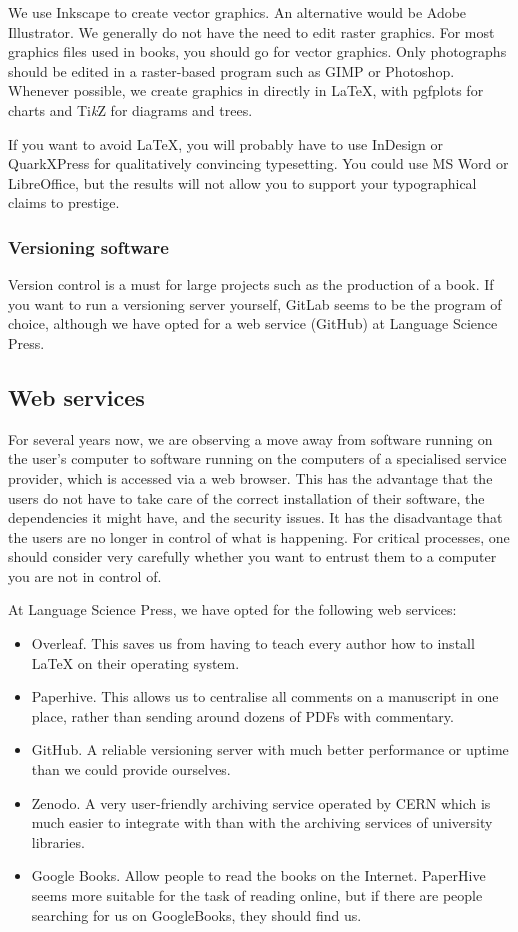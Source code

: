 \documentclass[guidelines,nonflat,modfonts] {langsci/langscibook}
\begin{document}
We use Inkscape to create vector graphics. An alternative would be Adobe Illustrator. We generally do not have the need to edit raster graphics. For most graphics files used in books, you should go for vector graphics. Only photographs should be edited in a raster-based program such as GIMP or Photoshop. Whenever possible, we create graphics in directly in \LaTeX\xspace, with pgfplots for charts and Ti\textit{k}Z for diagrams and trees. 

If you want to avoid \LaTeX\xspace, you will probably have to use InDesign or QuarkXPress for qualitatively convincing typesetting. You could use MS Word or LibreOffice, but the results will not allow you to support your typographical claims to prestige.


\subsubsection{Versioning software}
Version control is a must for large projects such as the production of a book. If you want to run a versioning server yourself, GitLab seems to be the program of choice, although we have opted for a web service (GitHub) at Language Science Press. 

\subsection{Web services}
For several years now, we are observing a move away from software running on the user's computer to software running on the computers of a specialised service provider, which is accessed via a web browser. This has the advantage that the users do not have to take care of the correct installation of their software, the dependencies it might have, and the security issues. It has the disadvantage that the users are no longer in control of what is happening. For critical processes, one should consider very carefully whether you want to entrust them to a computer you are not in control of. 

At Language Science Press, we have opted for the following web services: 

\begin{itemize}
 \item Overleaf. This saves us from having to teach every author how to install \LaTeX\xspace on their operating system. 
 \item Paperhive. This allows us to centralise all comments on a manuscript in one place, rather than sending around dozens of PDFs with commentary. 
 \item GitHub. A reliable versioning server with much better performance or uptime than we could provide ourselves. 
 \item Zenodo. A very user-friendly archiving service operated by CERN which is much easier to integrate with than with the archiving services of university libraries.
 \item Google Books. Allow people to read the books on the Internet. PaperHive seems more suitable for the task of reading online, but if there are people searching for us on GoogleBooks, they should find us. 
\end{itemize}
\end{document}
